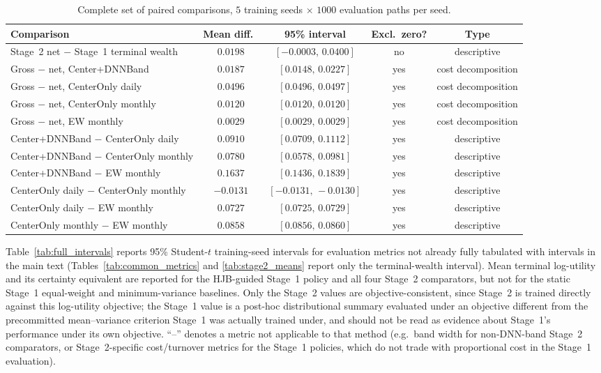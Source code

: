 \documentclass[a4paper,10pt]{article}
\begin{document}
\begin{table}[H]
\centering
\small
\caption{Complete set of paired comparisons, $5$ training seeds $\times$ $1000$ evaluation paths per seed.}
\label{tab:paired_full}
\begin{tabular}{lcccc}
\toprule
Comparison & Mean diff.\ & 95\% interval & Excl.\ zero? & Type \\
\midrule
Stage~2 net $-$ Stage~1 terminal wealth & $0.0198$ & $[-0.0003,\,0.0400]$ & no & descriptive \\
Gross $-$ net, Center+DNNBand & $0.0187$ & $[0.0148,\,0.0227]$ & yes & cost decomposition \\
Gross $-$ net, CenterOnly daily & $0.0496$ & $[0.0496,\,0.0497]$ & yes & cost decomposition \\
Gross $-$ net, CenterOnly monthly & $0.0120$ & $[0.0120,\,0.0120]$ & yes & cost decomposition \\
Gross $-$ net, EW monthly & $0.0029$ & $[0.0029,\,0.0029]$ & yes & cost decomposition \\
Center+DNNBand $-$ CenterOnly daily & $0.0910$ & $[0.0709,\,0.1112]$ & yes & descriptive \\
Center+DNNBand $-$ CenterOnly monthly & $0.0780$ & $[0.0578,\,0.0981]$ & yes & descriptive \\
Center+DNNBand $-$ EW monthly & $0.1637$ & $[0.1436,\,0.1839]$ & yes & descriptive \\
CenterOnly daily $-$ CenterOnly monthly & $-0.0131$ & $[-0.0131,\,-0.0130]$ & yes & descriptive \\
CenterOnly daily $-$ EW monthly & $0.0727$ & $[0.0725,\,0.0729]$ & yes & descriptive \\
CenterOnly monthly $-$ EW monthly & $0.0858$ & $[0.0856,\,0.0860]$ & yes & descriptive \\
\bottomrule
\end{tabular}
\end{table}

Table~\ref{tab:full_intervals} reports 95\% Student-$t$ training-seed intervals for evaluation metrics not already fully tabulated with intervals in the main text (Tables~\ref{tab:common_metrics} and \ref{tab:stage2_means} report only the terminal-wealth interval). Mean terminal log-utility and its certainty equivalent are reported for the HJB-guided Stage~1 policy and all four Stage~2 comparators, but not for the static Stage~1 equal-weight and minimum-variance baselines. Only the Stage~2 values are objective-consistent, since Stage~2 is trained directly against this log-utility objective; the Stage~1 value is a post-hoc distributional summary evaluated under an objective different from the precommitted mean--variance criterion Stage~1 was actually trained under, and should not be read as evidence about Stage~1's performance under its own objective. ``--'' denotes a metric not applicable to that method (e.g.\ band width for non-DNN-band Stage~2 comparators, or Stage~2-specific cost/turnover metrics for the Stage~1 policies, which do not trade with proportional cost in the Stage~1 evaluation).
\end{document}
